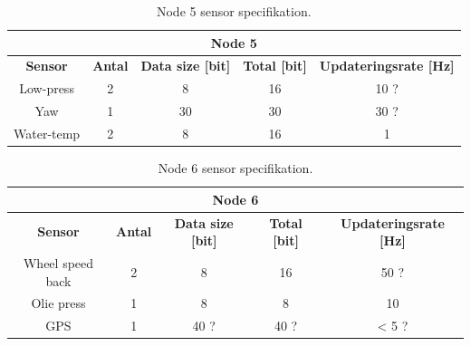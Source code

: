 \begin{table}[H] \centering
	\begin{tabular}{|c|c|c|c|c|}
        \hline \multicolumn{5}{|c|}{\textbf{Node 5}} \\
	    \hline \hline \textbf{Sensor} & \textbf{Antal} & \textbf{Data size [bit]} & \textbf{Total [bit]} & \textbf{Updateringsrate [Hz]}\\
        \hline Low-press & 2 &  8 & 16 & 10 ? \\
        \hline Yaw & 1 & 30 & 30 & 30 ? \\
        \hline Water-temp & 2 &  8 & 16 & 1 \\
        \hline
    \end{tabular}
\caption{Node 5 sensor specifikation.}
\label{table:CAN_node5}
\end{table}

\begin{table}[H] \centering
	\begin{tabular}{|c|c|c|c|c|}
        \hline \multicolumn{5}{|c|}{\textbf{Node 6}} \\
	    \hline \hline \textbf{Sensor} & \textbf{Antal} & \textbf{Data size [bit]} & \textbf{Total [bit]} & \textbf{Updateringsrate [Hz]}\\
        \hline Wheel speed back & 2 &  8 & 16 & 50 ?\\
        \hline Olie press & 1 &  8 & 8 & 10\\
        \hline GPS & 1 &  40 ? & 40 ? & < 5 ?\\
        \hline
    \end{tabular}
\caption{Node 6 sensor specifikation.}
\label{table:CAN_node6}
\end{table}
